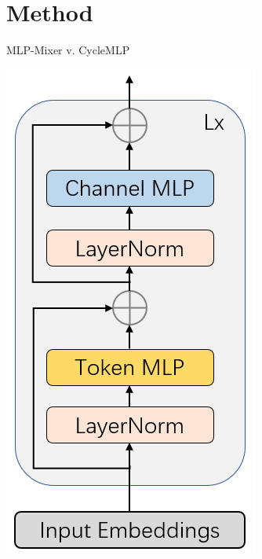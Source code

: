 \documentclass{beamer}
\begin{document}
\section{Method}

\begin{frame}{MLP-Mixer v. CycleMLP}
    \centering
    \parbox{.4\textwidth}{\centering \includegraphics[height=.8\textheight]{figures/mlp_mixer.png}}

\end{frame}
\end{document}
